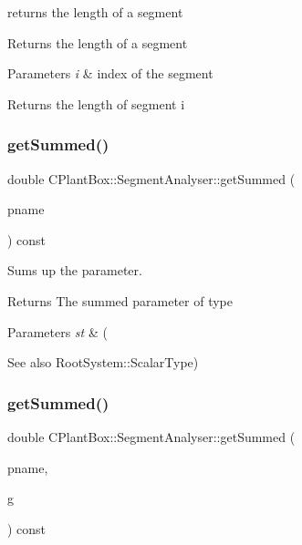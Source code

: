 returns the length of a segment 

Returns the length of a segment


\begin{DoxyParams}{Parameters}
{\em i} & index of the segment \\
\hline
\end{DoxyParams}
\begin{DoxyReturn}{Returns}
the length of segment i 
\end{DoxyReturn}
\mbox{\label{classCPlantBox_1_1SegmentAnalyser_a77c317cdd72d22e4e2181761b59dab76}} 
\subsubsection{\texorpdfstring{get\+Summed()}{getSummed()}\hspace{0.1cm}{\footnotesize\ttfamily [1/2]}}
{\footnotesize\ttfamily double C\+Plant\+Box\+::\+Segment\+Analyser\+::get\+Summed (\begin{DoxyParamCaption}\item[{std\+::string}]{pname }\end{DoxyParamCaption}) const}



Sums up the parameter. 

\begin{DoxyReturn}{Returns}
The summed parameter of type 
\end{DoxyReturn}

\begin{DoxyParams}{Parameters}
{\em st} & (\\
\hline
\end{DoxyParams}
\begin{DoxySeeAlso}{See also}
Root\+System\+::\+Scalar\+Type) 
\end{DoxySeeAlso}
\mbox{\label{classCPlantBox_1_1SegmentAnalyser_a1eab5114bd706b4942721d1f8deea328}} 
\subsubsection{\texorpdfstring{get\+Summed()}{getSummed()}\hspace{0.1cm}{\footnotesize\ttfamily [2/2]}}
{\footnotesize\ttfamily double C\+Plant\+Box\+::\+Segment\+Analyser\+::get\+Summed (\begin{DoxyParamCaption}\item[{std\+::string}]{pname,  }\item[{\hyperlink{classCPlantBox_1_1SignedDistanceFunction}{Signed\+Distance\+Function} $\ast$}]{g }\end{DoxyParamCaption}) const}



